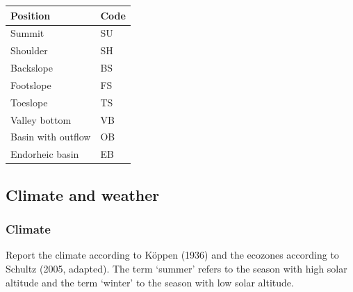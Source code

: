 \documentclass[
  letterpaper,
  DIV=11,
  numbers=noendperiod]{scrreprt}
\begin{document}
\begin{longtable}[]{@{}ll@{}}
\toprule()
Position & Code \\
\midrule()
\endhead
Summit & SU \\
Shoulder & SH \\
Backslope & BS \\
Footslope & FS \\
Toeslope & TS \\
Valley bottom & VB \\
Basin with outflow & OB \\
Endorheic basin & EB \\
\bottomrule()
\end{longtable}

\hypertarget{climate-and-weather}{%
\subsection{Climate and weather}\label{climate-and-weather}}

\hypertarget{climate}{%
\subsubsection{Climate}\label{climate}}

Report the climate according to Köppen (1936) and the ecozones according
to Schultz (2005, adapted). The term `summer' refers to the season with
high solar altitude and the term `winter' to the season with low solar
altitude.
\end{document}
